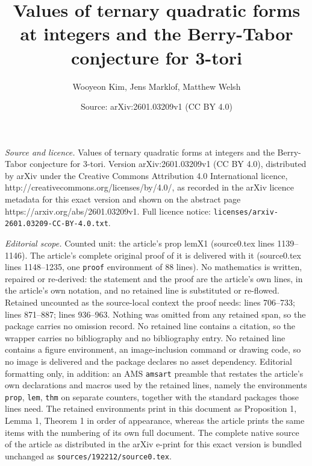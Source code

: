 \documentclass[10pt,a4paper]{amsart}
\title{Values of ternary quadratic forms at integers and the Berry-Tabor conjecture for 3-tori}
\author{Wooyeon Kim, Jens Marklof, Matthew Welsh}
\date{Source: arXiv:2601.03209v1 (CC BY 4.0)}
\begin{document}
\maketitle

\noindent\emph{Source and licence.} Values of ternary quadratic forms at integers and the Berry-Tabor conjecture for 3-tori. Version arXiv:2601.03209v1 (CC BY 4.0), distributed by arXiv under the Creative Commons Attribution 4.0 International licence, http://creativecommons.org/licenses/by/4.0/, as recorded in the arXiv licence metadata for this exact version and shown on the abstract page https://arxiv.org/abs/2601.03209v1. Full licence notice: \texttt{licenses/arxiv-2601.03209-CC-BY-4.0.txt}.\par\smallskip

\noindent\textit{Editorial scope.} Counted unit: the article's prop lemX1 (source0.tex lines 1139--1146). The article's complete original proof of it is delivered with it (source0.tex lines 1148--1235, one \texttt{proof} environment of 88 lines). No mathematics is written, repaired or re-derived: the statement and the proof are the article's own lines, in the article's own notation, and no retained line is substituted or re-flowed.  Retained uncounted as the source-local context the proof needs: lines 706--733; lines 871--887; lines 936--963.  Nothing was omitted from any retained span, so the package carries no omission record.  No retained line contains a citation, so the wrapper carries no bibliography and no bibliography entry.  No retained line contains a figure environment, an image-inclusion command or drawing code, so no image is delivered and the package declares no asset dependency.  Editorial formatting only, in addition: an AMS \texttt{amsart} preamble that restates the article's own declarations and macros used by the retained lines, namely the environments \texttt{prop}, \texttt{lem}, \texttt{thm} on separate counters, together with the standard packages those lines need.  The retained environments print in this document as Proposition 1, Lemma 1, Theorem 1 in order of appearance, whereas the article prints the same items with the numbering of its own full document.  The complete native source of the article as distributed in the arXiv e-print for this exact version is bundled unchanged as \texttt{sources/192212/source0.tex}.
\end{document}
